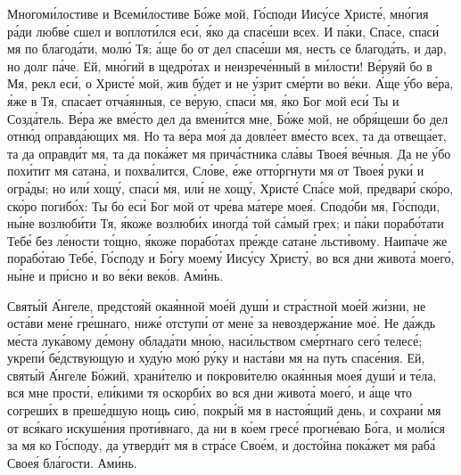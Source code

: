 \begin{mymulticols}
Многом\'{и}лостиве и Всем\'{и}лостиве Б\'{о}же мой, Г\'{о}споди Иис\'{у}се Христ\'{е}, мн\'{о}гия р\'{а}ди любв\'{е} сшел и воплот\'{и}лся ес\'{и}, \'{я}ко да спас\'{е}ши всех. И п\'{а}ки, Сп\'{а}се, спас\'{и} мя по благод\'{а}ти, мол\'{ю} Тя; \'{а}ще бо от дел спас\'{е}ши мя, несть се благод\'{а}ть, и дар, но долг п\'{а}че. Ей, мн\'{о}гий в щедр\'{о}тах и неизреч\'{е}нный в м\'{и}лости! В\'{е}руяй бо в Мя, рекл ес\'{и}, о Христ\'{е} мой, жив б\'{у}дет и не \'{у}зрит см\'{е}рти во в\'{е}ки. \'{А}ще \'{у}бо в\'{е}ра, \'{я}же в Тя, спас\'{а}ет отч\'{а}янныя, се в\'{е}рую, спас\'{и} мя, \'{я}ко Бог мой ес\'{и} Ты и Созд\'{а}тель. В\'{е}ра же вм\'{е}сто дел да вмен\'{и}тся мне, Б\'{о}же мой, не обр\'{я}щеши бо дел отн\'{ю}д оправд\'{а}ющих мя. Но та в\'{е}ра мо\'{я} да довл\'{е}ет вм\'{е}сто всех, та да отвещ\'{а}ет, та да оправд\'{и}т мя, та да пок\'{а}жет мя прич\'{а}стника сл\'{а}вы Твое\'{я} в\'{е}чныя. Да не \'{у}бо пох\'{и}тит мя сатан\'{а}, и похв\'{а}лится, Сл\'{о}ве, \'{е}же отт\'{о}ргнути мя от Твое\'{я} рук\'{и} и огр\'{а}ды; но ил\'{и} хощ\'{у}, спас\'{и} мя, ил\'{и} не хощ\'{у}, Христ\'{е} Сп\'{а}се мой, предвар\'{и} ск\'{о}ро, ск\'{о}ро погиб\'{о}х: Ты бо ес\'{и} Бог мой от чр\'{е}ва м\'{а}тере мое\'{я}. Спод\'{о}би мя, Г\'{о}споди, н\'{ы}не возлюб\'{и}ти Тя, \'{я}коже возлюб\'{и}х иногд\'{а} той с\'{а}мый грех; и п\'{а}ки пораб\'{о}тати Теб\'{е} без л\'{е}ности т\'{о}щно, \'{я}коже пораб\'{о}тах пр\'{е}жде сатан\'{е} льст\'{и}вому. Наип\'{а}че же пораб\'{о}таю Теб\'{е}, Г\'{о}споду и Б\'{о}гу моем\'{у} Иис\'{у}су Христ\'{у}, во вся дни живот\'{а} моег\'{о}, н\'{ы}не и пр\'{и}сно и во в\'{е}ки век\'{о}в. Ам\'{и}нь.


Свят\'{ы}й \'{А}нгеле, предсто\'{я}й ока\'{я}нной мо\'{е}й душ\'{и} и стр\'{а}стной мо\'{е}й ж\'{и}зни, не ост\'{а}ви мен\'{е} гр\'{е}шнаго, ниж\'{е} отступ\'{и} от мен\'{е} за невоздерж\'{а}ние мо\'{е}. Не д\'{а}ждь м\'{е}ста лук\'{а}вому д\'{е}мону облад\'{а}ти мн\'{о}ю, нас\'{и}льством см\'{е}ртнаго сег\'{о} телес\'{е}; укреп\'{и} б\'{е}дствующую и худ\'{у}ю мо\'{ю} р\'{у}ку и наст\'{а}ви мя на путь спас\'{е}ния. Ей, свят\'{ы}й \'{А}нгеле Б\'{о}жий, хран\'{и}телю и покров\'{и}телю ока\'{я}нныя мое\'{я} душ\'{и} и т\'{е}ла, вся мне прост\'{и}, ел\'{и}кими тя оскорб\'{и}х во вся дни живот\'{а} моег\'{о}, и \'{а}ще что согреш\'{и}х в преш\'{е}дшую нощь си\'{ю}, покр\'{ы}й мя в насто\'{я}щий день, и сохран\'{и} мя от вс\'{я}каго искуш\'{е}ния прот\'{и}внаго, да ни в к\'{о}ем грес\'{е} прогн\'{е}ваю Б\'{о}га, и мол\'{и}ся за мя ко Г\'{о}споду, да утверд\'{и}т мя в стр\'{а}се Сво\'{е}м, и дост\'{о}йна пок\'{а}жет мя раб\'{а} Свое\'{я} бл\'{а}гости. Ам\'{и}нь.


\end{mymulticols}
